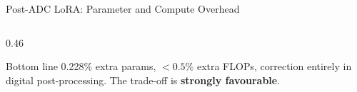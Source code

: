 \begin{frame}[shrink=20]{Post-ADC LoRA: Parameter and Compute Overhead}
\begin{columns}[T]
\begin{column}{0.46\textwidth}
      \vspace{0.15em}
      \vspace{0.15em}
      \begin{exampleblock}{Bottom line}
        \small 0.228\% extra params, $<0.5\%$ extra FLOPs,
        correction entirely in digital post-processing.
        The trade-off is \textbf{strongly favourable}.
      \end{exampleblock}
    \end{column}
  \end{columns}
\end{frame}

